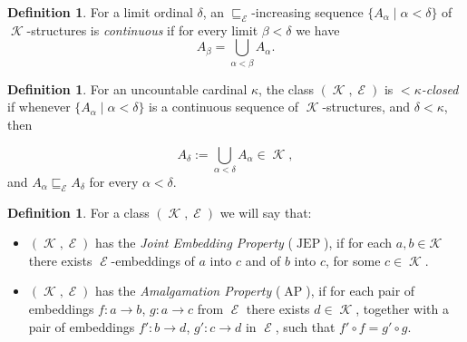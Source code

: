 \documentclass[11pt]{amsart}
\theoremstyle{definition}
\newtheorem{defin}[thm]{Definition}
\DeclareMathOperator{\K}{\mathcal K}
\DeclareMathOperator{\E}{\mathcal E}
\begin{document}
\begin{defin}
    For a limit ordinal $\delta$, an $\sqsubseteq_{\E}$-increasing sequence $\{A_\alpha \mid \alpha<\delta\}$ of $\K$-structures is \emph{continuous} if for every limit $\beta<\delta$ we have
    $$A_\beta=\bigcup\limits_{\alpha<\beta}A_\alpha.$$
    
\end{defin}

\begin{defin}
    For an uncountable cardinal $\kappa$, the class $(\K,\E)$ is \emph{$<\kappa$-closed} if whenever $\{A_\alpha \mid \alpha<\delta\}$ is a continuous sequence of $\K$-structures, and $\delta<\kappa$, then

    $$A_\delta:=\bigcup_{\alpha<\delta}A_\alpha \in \K,$$
    and $A_\alpha \sqsubseteq_{\E} A_\delta$ for every $\alpha<\delta$.    
\end{defin}



\begin{defin} For a class $(\K,\E)$ we will say that:
	\begin{itemize}
		\item $(\K,\E)$ has the \emph{Joint Embedding Property} ($\operatorname{JEP}$), if for each $a,b \in \mathcal{K}$ there exists $\E$-embeddings of $a$ into $c$ and of $b$ into $c$, for some $c \in \K$.\\
	\begin{center}
	\end{center}
		\item $(\K,\E)$ has the \emph{Amalgamation Property} ($\operatorname{AP}$), if for each pair of embeddings $f:a\longrightarrow b$, $g:a\longrightarrow c$ from $\E$ there exists $d\in \K$, together with a pair of embeddings $f':b\longrightarrow d$, $g':c\longrightarrow d$ in $\E$, such that $f'\circ f = g'\circ g$.\\
		\begin{center}
		\end{center}
	\end{itemize}
\end{defin}
\end{document}
